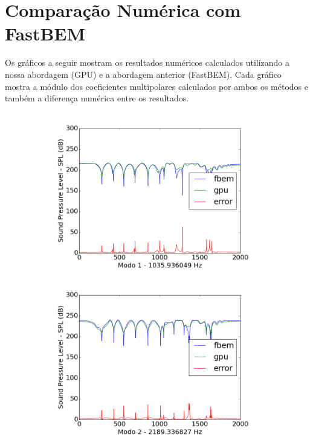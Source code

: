 \chapter{Comparação Numérica com FastBEM}

Os gráficos a seguir mostram os resultados numéricos calculados utilizando a nossa abordagem (GPU) e a abordagem anterior (FastBEM). Cada gráfico mostra a módulo dos coeficientes multipolares calculados por ambos os métodos e também a diferença numérica entre os resultados.
\begin{figure}[ht]
\centering%
\begin{subfigure}{0.45\textwidth}
	\centering
	\includegraphics[width=\textwidth]{../data/transfer_test/ceramic_plate/plots/ceramic_plate-tfv-0_1.png}
	\caption{}
	\label{fig:coef_plate_1}
\end{subfigure}%
\begin{subfigure}{0.45\textwidth}
	\centering
	\includegraphics[width=\textwidth]{../data/transfer_test/ceramic_plate/plots/ceramic_plate-tfv-0_2.png}

\end{subfigure}
\end{figure}
